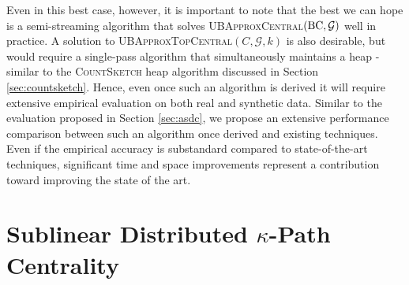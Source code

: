 \documentclass{report}
\newcommand{\algoname}[1]{\textnormal{\textsc{#1}}}
\begin{document}
Even in this best case, however, it is important to note that the best we can hope is a semi-streaming algorithm that solves \algoname{UBApproxCentral}$(\textnormal{BC}, \mathcal{G})$ well in practice. 
A solution to \algoname{UBApproxTopCentral}$(C, \mathcal{G}, k)$ is also desirable, but would require a single-pass algorithm that simultaneously maintains a heap - similar to the \algoname{CountSketch} heap algorithm discussed in Section \ref{sec:countsketch}. 
Hence, even once such an algorithm is derived it will require extensive empirical evaluation on both real and synthetic data.
Similar to the evaluation proposed in Section \ref{sec:asdc}, we propose an extensive performance comparison between such an algorithm once derived and existing techniques. 
Even if the empirical accuracy is substandard compared to state-of-the-art techniques, significant time and space improvements represent a contribution toward improving the state of the art. 


\section{Sublinear Distributed $\kappa$-Path Centrality}
 \label{kpath:sec:alg}
\end{document}
